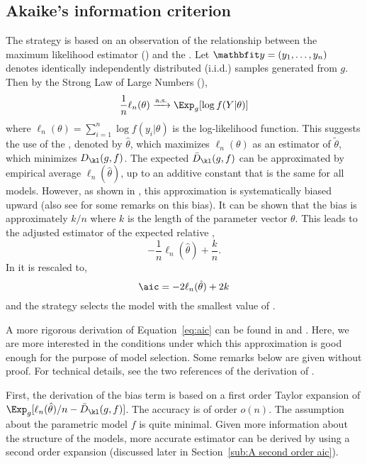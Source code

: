 \subsection{Akaike's information criterion}
\label{sub:Akaike's information criteria}

The \aic strategy is based on an observation of the relationship between the
maximum likelihood estimator (\mle) and the \kld. Let $\data =
(y_1,\dots,y_n)$ denotes identically independently distributed (i.i.d.)
samples generated from $g$. Then by the Strong Law of Large Numbers (\slln),
\begin{equation}
  \frac{1}{n}\ell_n(\theta) \xrightarrow{\text{a.s.}} \Exp_g[\log f(Y|\theta)]
  \label{eq:ml convergence}
\end{equation}
where $\ell_n(\theta) = \sum_{i=1}^n \log f(y_i|\theta)$ is the
log-likelihood function. This suggests the use of the \mle, denoted by
$\hat\theta$, which maximizes $\ell_n(\theta)$ as an estimator of
$\tilde\theta$, which minimizes $D_{\kl}(g,f)$. The expected \kld
$\bar{D}_{\kl}(g,f)$ can be approximated by empirical average
$\ell_n(\hat\theta)$, up to an additive constant that is the same for all
models. However, as shown in \cite{Akaike:1973uc}, this approximation is
systematically biased upward (also see \cite[][sec.~2.3]{Claeskens:2008tq}
for some remarks on this bias). It can be shown that the bias is
approximately $k/n$ where $k$ is the length of the parameter vector $\theta$.
This leads to the adjusted estimator of the expected relative \kld,
\begin{equation}
  -\frac{1}{n}\ell_n(\hat\theta) + \frac{k}{n}.
\end{equation}
In \cite{Akaike:1973uc} it is rescaled to,
\begin{equation}
  \aic = -2\ell_n(\hat\theta) + 2k
  \label{eq:aic}
\end{equation}
and the \aic strategy selects the model with the smallest value of \aic.

A more rigorous derivation of Equation~\eqref{eq:aic} can be found in
\cite[][sec.~2.3]{Claeskens:2008tq} and \cite[][sec.~6.2]{Burnham:2002wc}.
Here, we are more interested in the conditions under which this approximation
is good enough for the purpose of model selection. Some remarks below are
given without proof. For technical details, see the two references of the
derivation of \aic.

First, the derivation of the bias term is based on a first order Taylor
expansion of $\Exp_g[\ell_n(\hat\theta)/n - \bar{D}_{\kl}(g,f)]$. The
accuracy is of order $o(n)$. The assumption about the parametric model $f$ is
quite minimal. Given more information about the structure of the models,
more accurate estimator can be derived by using a second order expansion
(discussed later in Section~\ref{sub:A second order aic}).

